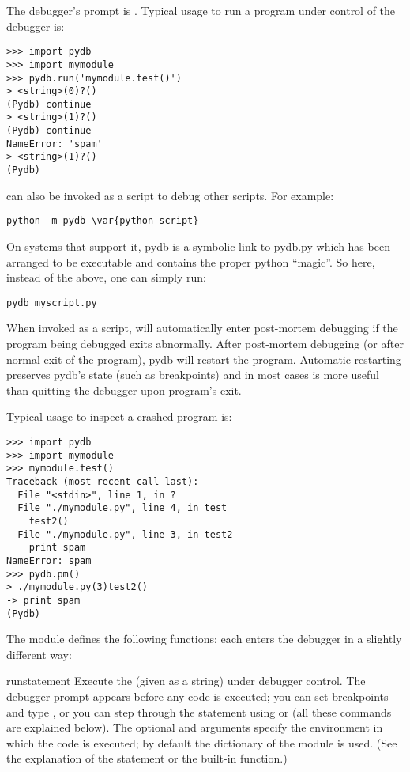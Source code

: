 The debugger's prompt is .
Typical usage to run a program under control of the debugger is:

\begin{verbatim}
>>> import pydb
>>> import mymodule
>>> pydb.run('mymodule.test()')
> <string>(0)?()
(Pydb) continue
> <string>(1)?()
(Pydb) continue
NameError: 'spam'
> <string>(1)?()
(Pydb) 
\end{verbatim}

 can also be invoked as
a script to debug other scripts.  For example:

\begin{verbatim}
python -m pydb \var{python-script}
\end{verbatim}

On systems that support it, pydb is a symbolic link to pydb.py which
has been arranged to be executable and contains the proper python
``magic''. So here, instead of the above, one can simply run:

\begin{verbatim}
pydb myscript.py
\end{verbatim}

When invoked as a script,  will automatically enter
post-mortem debugging if the program being debugged exits
abnormally. After post-mortem debugging (or after normal exit of the
program), pydb will restart the program.  Automatic restarting
preserves pydb's state (such as breakpoints) and in most cases is more
useful than quitting the debugger upon program's exit.

Typical usage to inspect a crashed program is:

\begin{verbatim}
>>> import pydb
>>> import mymodule
>>> mymodule.test()
Traceback (most recent call last):
  File "<stdin>", line 1, in ?
  File "./mymodule.py", line 4, in test
    test2()
  File "./mymodule.py", line 3, in test2
    print spam
NameError: spam
>>> pydb.pm()
> ./mymodule.py(3)test2()
-> print spam
(Pydb) 
\end{verbatim}

The module defines the following functions; each enters the debugger
in a slightly different way:

\begin{funcdesc}{run}{statement}
Execute the  (given as a string) under debugger
control.  The debugger prompt appears before any code is executed; you
can set breakpoints and type , or you can step through
the statement using  or  (all these commands are
explained below).  The optional  and 
arguments specify the environment in which the code is executed; by
default the dictionary of the module  is
used.  (See the explanation of the  statement or the
 built-in function.)
\end{funcdesc}

